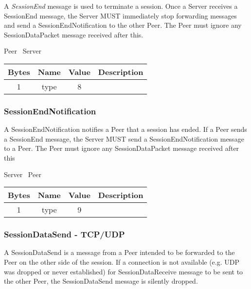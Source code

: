A \emph{SessionEnd} message is used to terminate a session. Once a Server receives a SessionEnd message, the Server
MUST immediately stop forwarding messages and send a SessionEndNotification to the other Peer. The Peer must ignore
any SessionDataPacket message received after this.

\begin{center}
    Peer \textrightarrow\ Server\\
    \begin{tabular}{|c|c|c|c|}
        \hline
        \textbf{Bytes} & \textbf{Name} & \textbf{Value} & \textbf{Description} \\
        \hline
        1              & type          & 8              &                      \\
        \hline
    \end{tabular}
\end{center}

\subsubsection{SessionEndNotification}

A SessionEndNotification notifies a Peer that a session has ended. If a Peer sends a SessionEnd
message, the Server MUST send a SessionEndNotification message to a Peer. The Peer must ignore
any SessionDataPacket message received after this

\begin{center}
    Server \textrightarrow\ Peer\\
    \begin{tabular}{|c|c|c|c|}
        \hline
        \textbf{Bytes} & \textbf{Name} & \textbf{Value} & \textbf{Description} \\
        \hline
        1              & type          & 9              &                      \\
        \hline
    \end{tabular}
\end{center}

\subsubsection{SessionDataSend - TCP/UDP}

A SessionDataSend is a message from a Peer intended to be forwarded to the Peer on the other side of the
session. If a connection is not available (e.g. UDP was dropped or never established) for
SessionDataReceive message to be sent to the other Peer, the SessionDataSend message is silently dropped.

